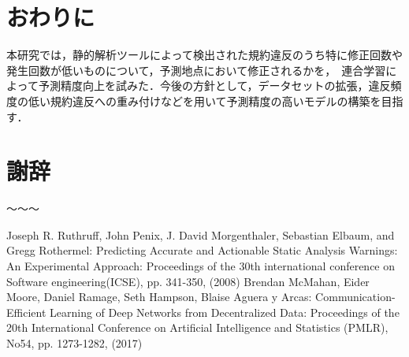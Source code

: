 \documentclass[uplatex,dvipdfmx,a4paper,twocolumn,base=11pt,jbase=11pt,ja=standard]{bxjsarticle}  %
\begin{document}




\section{おわりに}

本研究では，静的解析ツールによって検出された規約違反のうち特に修正回数や発生回数が低いものについて，予測地点において修正されるかを，　連合学習によって予測精度向上を試みた．今後の方針として，データセットの拡張，違反頻度の低い規約違反への重み付けなどを用いて予測精度の高いモデルの構築を目指す．






\section*{謝辞}
〜〜〜


\begin{thebibliography}{1}
     Joseph R. Ruthruff, John Penix, J. David Morgenthaler, Sebastian Elbaum, and Gregg Rothermel: Predicting Accurate and Actionable Static Analysis Warnings: An Experimental Approach: Proceedings of the 30th international conference on Software engineering(ICSE), pp. 341-350, (2008)
     Brendan McMahan, Eider Moore, Daniel Ramage, Seth Hampson, Blaise Aguera y Arcas: Communication-Efficient Learning of Deep Networks from Decentralized Data: Proceedings of the 20th International Conference on Artificial Intelligence and Statistics (PMLR), No54, pp. 1273-1282, (2017)
\end{thebibliography}





%
\end{document}
